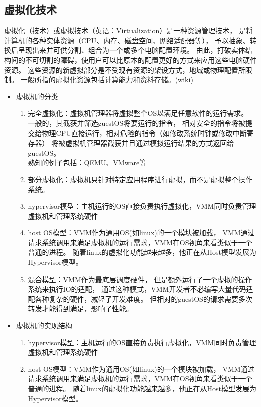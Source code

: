 \documentclass[AutoFakeBold,a4paper]{ctexart}
\begin{document}
\subsection{虚拟化技术}
虚拟化（技术）或虚拟技术（英语：Virtualization）是一种资源管理技术，
是将计算机的各种实体资源（CPU、内存、磁盘空间、网络适配器等），
予以抽象、转换后呈现出来并可供分割、组合为一个或多个电脑配置环境。
由此，打破实体结构间的不可切割的障碍，使用户可以比原本的配置更好的方式来应用这些电脑硬件资源。
这些资源的新虚拟部分是不受现有资源的架设方式，地域或物理配置所限制。
一般所指的虚拟化资源包括计算能力和资料存储。(wiki)
\begin{itemize}
    \item 虚拟机的分类
    \begin{enumerate}
        \item 完全虚拟化：虚拟机管理器将虚拟整个OS以满足任意软件的运行需求。
        一般的，其截获并筛选guestOS将要运行的指令，
        相对安全的指令将被提交给物理CPU直接运行，相对危险的指令（如修改系统时钟或修改中断寄存器）
        将被虚拟机管理器截获并且通过模拟运行结果的方式返回给guestOS。\\
        熟知的例子包括：QEMU、VMware等
        \item 部分虚拟化：虚拟机只针对特定应用程序进行虚拟，而不是虚拟整个操作系统。
        \item hypervisor模型：主机运行的OS直接负责执行虚拟化，VMM同时负责管理虚拟机和管理系统硬件
        \item host OS模型：VMM作为通用OS(如linux)的一个模块被加载，
        VMM通过请求系统调用来满足虚拟机的运行需求，VMM在OS视角来看类似于一个普通的进程。
        随着linux的虚拟化功能越来越多，他正在从Host模型发展为Hypervisor模型。
        \item 混合模型：VMM作为最底层调度硬件，
        但是额外运行了一个虚拟的操作系统来执行IO的适配，
        通过这种模式，VMM开发者不必编写大量代码适配各种复杂的硬件，减轻了开发难度。
        但相对的guestOS的请求需要多次转发才能得到满足，影响了性能。
    \end{enumerate}
    \item 虚拟机的实现结构
    \begin{enumerate}
        \item hypervisor模型：主机运行的OS直接负责执行虚拟化，VMM同时负责管理虚拟机和管理系统硬件
        \item host OS模型：VMM作为通用OS(如linux)的一个模块被加载，
        VMM通过请求系统调用来满足虚拟机的运行需求，VMM在OS视角来看类似于一个普通的进程。
        随着linux的虚拟化功能越来越多，他正在从Host模型发展为Hypervisor模型。

\end{enumerate}
\end{itemize}
\end{document}
